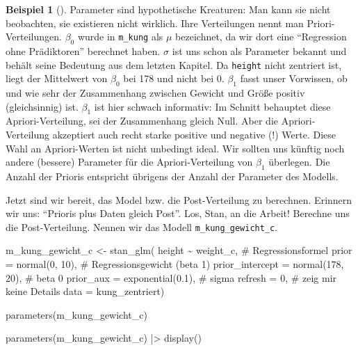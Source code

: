 \documentclass[
  ngerman,
  letterpaper,
  twoside,
  open=any]{scrbook}
\newenvironment{Shaded}{\begin{snugshade}}{\end{snugshade}}
\newcommand{\AttributeTok}[1]{\textcolor[rgb]{0.40,0.45,0.13}{#1}}
\newcommand{\CommentTok}[1]{\textcolor[rgb]{0.37,0.37,0.37}{#1}}
\newcommand{\DecValTok}[1]{\textcolor[rgb]{0.68,0.00,0.00}{#1}}
\newcommand{\FloatTok}[1]{\textcolor[rgb]{0.68,0.00,0.00}{#1}}
\newcommand{\FunctionTok}[1]{\textcolor[rgb]{0.28,0.35,0.67}{#1}}
\newcommand{\NormalTok}[1]{\textcolor[rgb]{0.00,0.23,0.31}{#1}}
\newcommand{\OtherTok}[1]{\textcolor[rgb]{0.00,0.23,0.31}{#1}}
\newcommand{\SpecialCharTok}[1]{\textcolor[rgb]{0.37,0.37,0.37}{#1}}
\theoremstyle{definition}
\newtheorem{example}{Beispiel}[chapter]
\theoremstyle{plain}
\theoremstyle{definition}
\theoremstyle{definition}
\theoremstyle{remark}
\begin{document}
\begin{example}[]
Parameter sind hypothetische Kreaturen: Man kann sie nicht beobachten,
sie existieren nicht wirklich. Ihre Verteilungen nennt man
Priori-Verteilungen. \(\beta_0\) wurde in \texttt{m\_kung} als \(\mu\)
bezeichnet, da wir dort eine \enquote{Regression ohne Prädiktoren}
berechnet haben. \(\sigma\) ist uns schon als Parameter bekannt und
behält seine Bedeutung aus dem letzten Kapitel. Da \texttt{height} nicht
zentriert ist, liegt der Mittelwert von \(\beta_0\) bei 178 und nicht
bei 0. \(\beta_1\) fasst unser Vorwissen, ob und wie sehr der
Zusammenhang zwischen Gewicht und Größe positiv (gleichsinnig) ist.
\(\beta_1\) ist hier schwach informativ: Im Schnitt behauptet diese
Apriori-Verteilung, sei der Zusammenhang gleich Null. Aber die
Apriori-Verteilung akzeptiert auch recht starke positive und negative
(!) Werte. Diese Wahl an Apriori-Werten ist nicht unbedingt ideal. Wir
sollten uns künftig noch andere (bessere) Parameter für die
Apriori-Verteilung von \(\beta_1\) überlegen. Die Anzahl der Prioris
entspricht übrigens der Anzahl der Parameter des Modells.

Jetzt sind wir bereit, das Model bzw. die Post-Verteilung zu berechnen.
Erinnern wir uns: \enquote{Prioris plus Daten gleich Post}. Los, Stan,
an die Arbeit! Berechne uns die Post-Verteilung. Nennen wir das Modell
\texttt{m\_kung\_gewicht\_c}.

\begin{Shaded}
\begin{Highlighting}[]
\NormalTok{m\_kung\_gewicht\_c }\OtherTok{\textless{}{-}}
  \FunctionTok{stan\_glm}\NormalTok{(}
\NormalTok{    height }\SpecialCharTok{\textasciitilde{}}\NormalTok{ weight\_c,  }\CommentTok{\# Regressionsformel}
    \AttributeTok{prior =} \FunctionTok{normal}\NormalTok{(}\DecValTok{0}\NormalTok{, }\DecValTok{10}\NormalTok{),  }\CommentTok{\# Regressionsgewicht (beta 1)}
    \AttributeTok{prior\_intercept =} \FunctionTok{normal}\NormalTok{(}\DecValTok{178}\NormalTok{, }\DecValTok{20}\NormalTok{),  }\CommentTok{\# beta 0}
    \AttributeTok{prior\_aux =} \FunctionTok{exponential}\NormalTok{(}\FloatTok{0.1}\NormalTok{),  }\CommentTok{\# sigma}
    \AttributeTok{refresh =} \DecValTok{0}\NormalTok{,  }\CommentTok{\# zeig mir keine Details}
    \AttributeTok{data =}\NormalTok{ kung\_zentriert)}

\FunctionTok{parameters}\NormalTok{(m\_kung\_gewicht\_c)}
\end{Highlighting}
\end{Shaded}

\begin{Shaded}
\begin{Highlighting}[]
\FunctionTok{parameters}\NormalTok{(m\_kung\_gewicht\_c) }\SpecialCharTok{|\textgreater{}} \FunctionTok{display}\NormalTok{()}
\end{Highlighting}
\end{Shaded}


\end{example}
\end{document}
